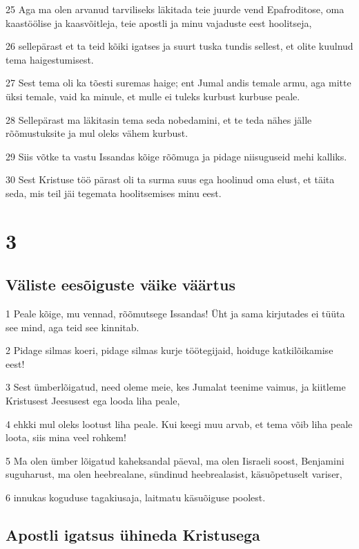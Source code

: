 \par 25 Aga ma olen arvanud tarviliseks läkitada teie juurde vend Epafroditose, oma kaastöölise ja kaasvõitleja, teie apostli ja minu vajaduste eest hoolitseja,
\par 26 sellepärast et ta teid kõiki igatses ja suurt tuska tundis sellest, et olite kuulnud tema haigestumisest.
\par 27 Sest tema oli ka tõesti suremas haige; ent Jumal andis temale armu, aga mitte üksi temale, vaid ka minule, et mulle ei tuleks kurbust kurbuse peale.
\par 28 Sellepärast ma läkitasin tema seda nobedamini, et te teda nähes jälle rõõmustuksite ja mul oleks vähem kurbust.
\par 29 Siis võtke ta vastu Issandas kõige rõõmuga ja pidage niisuguseid mehi kalliks.
\par 30 Sest Kristuse töö pärast oli ta surma suus ega hoolinud oma elust, et täita seda, mis teil jäi tegemata hoolitsemises minu eest.


\chapter{3}

\section*{Väliste eesõiguste väike väärtus}

\par 1 Peale kõige, mu vennad, rõõmutsege Issandas! Üht ja sama kirjutades ei tüüta see mind, aga teid see kinnitab.
\par 2 Pidage silmas koeri, pidage silmas kurje töötegijaid, hoiduge katkilõikamise eest!
\par 3 Sest ümberlõigatud, need oleme meie, kes Jumalat teenime vaimus, ja kiitleme Kristusest Jeesusest ega looda liha peale,
\par 4 ehkki mul oleks lootust liha peale. Kui keegi muu arvab, et tema võib liha peale loota, siis mina veel rohkem!
\par 5 Ma olen ümber lõigatud kaheksandal päeval, ma olen Iisraeli soost, Benjamini suguharust, ma olen heebrealane, sündinud heebrealasist, käsuõpetuselt variser,
\par 6 innukas koguduse tagakiusaja, laitmatu käsuõiguse poolest.

\section*{Apostli igatsus ühineda Kristusega}

